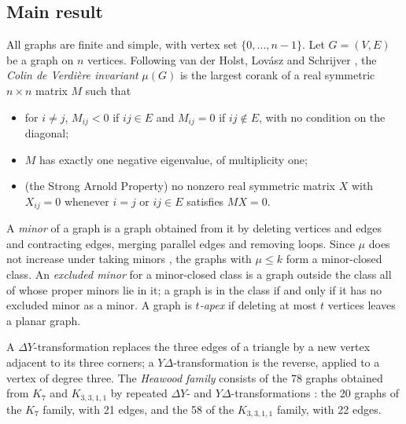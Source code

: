 \documentclass[11pt]{article}
\theoremstyle{remark}
\begin{document}
\subsection{Main result}
All graphs are finite and simple, with vertex set $\{0,\dots,n-1\}$. Let
$G=(V,E)$ be a graph on $n$ vertices. Following van der Holst, Lovász and
Schrijver \cite[1.1]{HLS}, the \emph{Colin de Verdière invariant}
$\mu(G)$ is the largest corank of a real symmetric $n\times n$ matrix $M$
such that
\begin{itemize}
\item[(i)] for $i\ne j$, $M_{ij}<0$ if $ij\in E$ and $M_{ij}=0$ if
  $ij\notin E$, with no condition on the diagonal;
\item[(ii)] $M$ has exactly one negative eigenvalue, of multiplicity one;
\item[(iii)] (the Strong Arnold Property) no nonzero real symmetric matrix
  $X$ with $X_{ij}=0$ whenever $i=j$ or $ij\in E$ satisfies $MX=0$.
\end{itemize}
A \emph{minor} of a graph is a graph obtained from it by deleting vertices
and edges and contracting edges, merging parallel edges and removing loops.
Since $\mu$ does not increase under taking minors \cite{CdV}, the graphs
with $\mu\le k$ form a minor-closed class. An \emph{excluded minor} for a
minor-closed class is a graph outside the class all of whose proper minors
lie in it; a graph is in the class if and only if it has no excluded minor
as a minor. A graph is \emph{$t$-apex} if deleting at most $t$ vertices
leaves a planar graph.

A $\Delta Y$-transformation replaces the three edges of a triangle by a
new vertex adjacent to its three corners; a $Y\Delta$-transformation is the
reverse, applied to a vertex of degree three. The \emph{Heawood family}
consists of the 78 graphs obtained from $K_7$ and $K_{3,3,1,1}$ by
repeated $\Delta Y$- and $Y\Delta$-transformations \cite[\S1.1]{GW}: the
20 graphs of the $K_7$ family, with 21 edges, and the 58 of the
$K_{3,3,1,1}$ family, with 22 edges.
\end{document}
